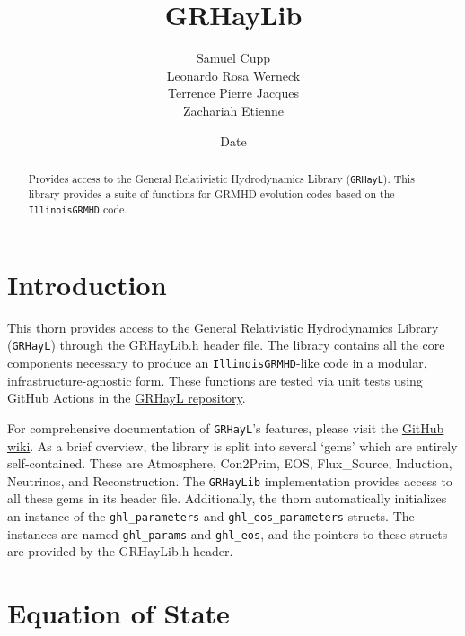 \documentclass{article}
\begin{document}
\title{GRHayLib}
\author{Samuel Cupp \\ Leonardo Rosa Werneck \\ Terrence Pierre Jacques \\ Zachariah Etienne}
\date{$ $Date$ $}

\maketitle


\newcommand{\grhayl}{\texttt{GRHayL}}
\newcommand{\glib}{\texttt{GRHayLib}}
\newcommand{\igm}{\texttt{IllinoisGRMHD}}
\newcommand{\hydrobase}{\texttt{HydroBase}}

\begin{abstract}
Provides access to the General Relativistic Hydrodynamics
Library (\grhayl). This library provides a suite of functions
for GRMHD evolution codes based on the \igm{} code.
\end{abstract}

\section{Introduction}

This thorn provides access to the General Relativistic
Hydrodynamics Library (\grhayl) through the GRHayLib.h
header file. The library contains all the core components
necessary to produce an \igm-like code in a modular,
infrastructure-agnostic form. These functions are tested
via unit tests using GitHub Actions in the
\href{https://github.com/GRHayL/GRHayL}{GRHayL repository}.

For comprehensive documentation of \grhayl's features, please
visit the \href{https://github.com/GRHayL/GRHayL/wiki}{GitHub wiki}.
As a brief overview, the library is split into several `gems'
which are entirely self-contained. These are Atmosphere, Con2Prim,
EOS, Flux\_Source, Induction, Neutrinos, and Reconstruction.
The \glib{} implementation provides access to all these gems in its
header file. Additionally, the thorn automatically initializes an
instance of the \texttt{ghl\_parameters} and \texttt{ghl\_eos\_parameters}
structs. The instances are named \texttt{ghl\_params} and \texttt{ghl\_eos},
and the pointers to these structs are provided by the GRHayLib.h
header.

\section{Equation of State}
\end{document}
